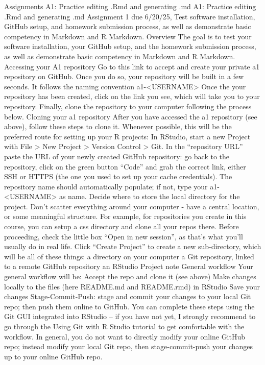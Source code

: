 \begin{userprompt}

Assignments
A1: Practice editing .Rmd and generating .md
A1: Practice editing .Rmd and generating .md
Assignment 1 due 6/20/25, Test software installation, GitHub setup, and homework submission process, as well as demonstrate basic competency in Markdown and R Markdown.
Overview
The goal is to test your software installation, your GitHub setup, and the homework submission process, as well as demonstrate basic competency in Markdown and R Markdown.
Accessing your A1 repository
Go to this link to accept and create your private a1 repository on GitHub. Once you do so, your repository will be built in a few seconds. It follows the naming convention a1-<USERNAME>
Once the your repository has been created, click on the link you see, which will take you to your repository.
Finally, clone the repository to your computer following the process below.
Cloning your a1 repository
After you have accessed the a1 repository (see above), follow these steps to clone it. Whenever possible, this will be the preferred route for setting up your R projects:
In RStudio, start a new Project with File > New Project > Version Control > Git. In the “repository URL” paste the URL of your newly created GitHub repository: go back to the repository, click on the green button “Code” and grab the correct link, either SSH or HTTPS (the one you used to set up your cache credentials). The repository name should automatically populate; if not, type your a1-<USERNAME> as name.
Decide where to store the local directory for the project. Don’t scatter everything around your computer - have a central location, or some meaningful structure. For example, for repositories you create in this course, you can setup a css directory and clone all your repos there.
Before proceeding, check the little box “Open in new session”, as that’s what you’ll usually do in real life.
Click “Create Project” to create a new sub-directory, which will be all of these things:
a directory on your computer
a Git repository, linked to a remote GitHub repository
an RStudio Project
note
General workflow
Your general workflow will be:
Accept the repo and clone it (see above)
Make changes locally to the files (here README.md and README.rmd) in RStudio
Save your changes
Stage-Commit-Push: stage and commit your changes to your local Git repo; then push them online to GitHub. You can complete these steps using the Git GUI integrated into RStudio – if you have not yet, I strongly recommend to go through the Using Git with R Studio tutorial to get comfortable with the workflow. In general, you do not want to directly modify your online GitHub repo; instead modify your local Git repo, then stage-commit-push your changes up to your online GitHub repo.

\end{userprompt}
